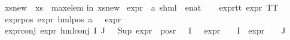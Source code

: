 \begin{isabellebody}
xs{\isacharunderscore}{\kern0pt}new\ {\isacharequal}{\kern0pt}\ xs\ {\isacharminus}{\kern0pt}\ {\isacharbraceleft}{\kern0pt}max{\isacharunderscore}{\kern0pt}elem{\isacharbraceright}{\kern0pt}\isanewline
in\ xs{\isacharunderscore}{\kern0pt}new{\isacharparenright}{\kern0pt}{\isachardoublequoteclose}\isanewline
\isanewline
{}\isamarkupfalse%
\ expr{\isacharunderscore}{\kern0pt}{}\ {\isacharcolon}{\kern0pt}{\isacharcolon}{\kern0pt}\ {\isachardoublequoteopen}{\isacharparenleft}{\kern0pt}{\isacharprime}{\kern0pt}a{\isacharcomma}{\kern0pt}\ {\isacharprime}{\kern0pt}s{\isacharparenright}{\kern0pt}hml\ {\isasymRightarrow}\ enat{\isachardoublequoteclose}\ \isanewline
\ \ \isanewline
expr{\isacharunderscore}{\kern0pt}{}{\isacharunderscore}{\kern0pt}tt{\isacharcolon}{\kern0pt}\ {\isachardoublequoteopen}expr{\isacharunderscore}{\kern0pt}{}\ TT\ {\isacharequal}{\kern0pt}\ {}{\isachardoublequoteclose}\ {\isacharbar}{\kern0pt}\isanewline
expr{\isacharunderscore}{\kern0pt}{}{\isacharunderscore}{\kern0pt}pos{\isacharcolon}{\kern0pt}\ {\isachardoublequoteopen}expr{\isacharunderscore}{\kern0pt}{}\ {\isacharparenleft}{\kern0pt}hml{\isacharunderscore}{\kern0pt}pos\ a\ {\isasymphi}{\isacharparenright}{\kern0pt}\ {\isacharequal}{\kern0pt}\ expr{\isacharunderscore}{\kern0pt}{}\ {\isasymphi}{\isachardoublequoteclose}\ {\isacharbar}{\kern0pt}\isanewline
expr{\isacharunderscore}{\kern0pt}{}{\isacharunderscore}{\kern0pt}conj{\isacharcolon}{\kern0pt}\ {\isachardoublequoteopen}expr{\isacharunderscore}{\kern0pt}{}\ {\isacharparenleft}{\kern0pt}hml{\isacharunderscore}{\kern0pt}conj\ I\ J\ {\isasymPhi}{\isacharparenright}{\kern0pt}\ {\isacharequal}{\kern0pt}\ Sup\ {\isacharparenleft}{\kern0pt}{\isacharparenleft}{\kern0pt}expr{\isacharunderscore}{\kern0pt}{}\ {\isacharbackquote}{\kern0pt}\ {\isacharparenleft}{\kern0pt}pos{\isacharunderscore}{\kern0pt}r\ {\isacharparenleft}{\kern0pt}{\isasymPhi}\ {\isacharbackquote}{\kern0pt}\ I{\isacharparenright}{\kern0pt}{\isacharparenright}{\kern0pt}{\isacharparenright}{\kern0pt}\ \ {\isasymunion}\ {\isacharparenleft}{\kern0pt}expr{\isacharunderscore}{\kern0pt}{}\ {\isasymcirc}\ {\isasymPhi}{\isacharparenright}{\kern0pt}\ {\isacharbackquote}{\kern0pt}\ I\ {\isasymunion}\ {\isacharparenleft}{\kern0pt}expr{\isacharunderscore}{\kern0pt}{}\ {\isasymcirc}\ {\isasymPhi}{\isacharparenright}{\kern0pt}\ {\isacharbackquote}{\kern0pt}\ J{\isacharparenright}{\kern0pt}{\isachardoublequoteclose}\isanewline

\end{isabellebody}
